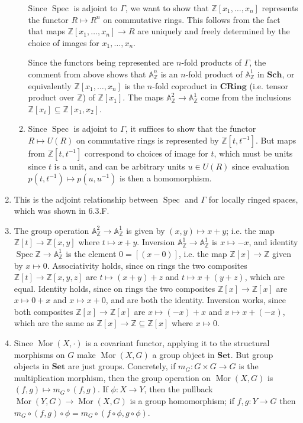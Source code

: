 \documentclass{report}
\newcommand{\cat}[1]{\mathbf{#1}} %
\newcommand{\A}{\mathbb{A}}
\newcommand{\Z}{\mathbb{Z}}
\DeclareMathOperator{\Mor}{Mor}
\DeclareMathOperator{\Spec}{Spec}
\begin{document}
\begin{enumerate}[label=\textbf{6.6.\Alph*.}]
\begin{enumerate}[label=(\alph*)]
		            Since $\Spec$ is adjoint to $\Gamma$, we want to show that
		            $\Z[x_1,\ldots,x_n]$ represents the functor $R\mapsto R^n$ on
		            commutative rings. This follows from the fact that maps
		            $\Z[x_1,\ldots,x_n]\to R$ are uniquely and freely determined by
		            the choice of images for $x_1,\ldots,x_n$.

		            Since the functors being represented are $n$-fold products of
		            $\Gamma$, the comment from above shows that $\A^n_\Z$ is an
		            $n$-fold product of $\A^1_\Z$ in $\cat{Sch}$, or equivalently
		            $\Z[x_1,\ldots,x_n]$ is the $n$-fold coproduct in $\cat{CRing}$
		            (i.e. tensor product over $\Z$) of $\Z[x_1]$. The maps
		            $\A^2_\Z\to\A^1_\Z$ come from the inclusions
		            $\Z[x_i]\subseteq\Z[x_1,x_2]$.

		      \item Since $\Spec$ is adjoint to $\Gamma$, it suffices to show that
		            the functor $R\mapsto U(R)$ on commutative rings is represented
		            by $\Z[t,t^{-1}]$. But maps from $\Z[t,t^{-1}]$ correspond to
		            choices of image for $t$, which must be units since $t$ is a
		            unit, and can be arbitrary units $u\in U(R)$ since evaluation
		            $p(t,t^{-1})\mapsto p(u,u^{-1})$ is then a homomorphism.
	      \end{enumerate}

	\item This is the adjoint relationship between $\Spec$ and $\Gamma$ for
	      locally ringed spaces, which was shown in 6.3.F.

	\item The group operation $\A^2_\Z\to\A^1_\Z$ is given by
	      $(x,y)\mapsto x+y$; i.e. the map $\Z[t]\to\Z[x,y]$ where
	      $t\mapsto x+y$. Inversion $\A^1_\Z\to\A^1_\Z$ is $x\mapsto-x$, and
	      identity $\Spec\Z\to\A^1_\Z$ is the element $0=[(x-0)]$, i.e. the map
	      $\Z[x]\to\Z$ given by $x\mapsto0$. Associativity holds, since on rings
	      the two composites $\Z[t]\to\Z[x,y,z]$ are $t\mapsto(x+y)+z$ and
	      $t\mapsto x+(y+z)$, which are equal. Identity holds, since on rings
	      the two composites $\Z[x]\to\Z[x]$ are $x\mapsto0+x$ and
	      $x\mapsto x+0$, and are both the identity. Inversion works, since both
	      composites $\Z[x]\to\Z[x]$ are $x\mapsto(-x)+x$ and $x\mapsto x+(-x)$,
	      which are the same as $\Z[x]\to\Z\subseteq\Z[x]$ where $x\mapsto0$.

	\item Since $\Mor(X,\cdot)$ is a covariant functor, applying it to the
	      structural morphisms on $G$ make $\Mor(X,G)$ a group object in
	      $\cat{Set}$. But group objects in $\cat{Set}$ are just groups.
	      Concretely, if $m_G:G\times G\to G$ is the multiplication morphism,
	      then the group operation on $\Mor(X,G)$ is $(f,g)\mapsto m_G\circ(f,g)$.
	      If $\phi:X\to Y$, then the pullback $\Mor(Y,G)\to\Mor(X,G)$ is a group
	      homomorphism; if $f,g:Y\to G$ then
	      $m_G\circ(f,g)\circ\phi=m_G\circ(f\circ\phi,g\circ\phi)$.


\end{enumerate}
\end{document}
